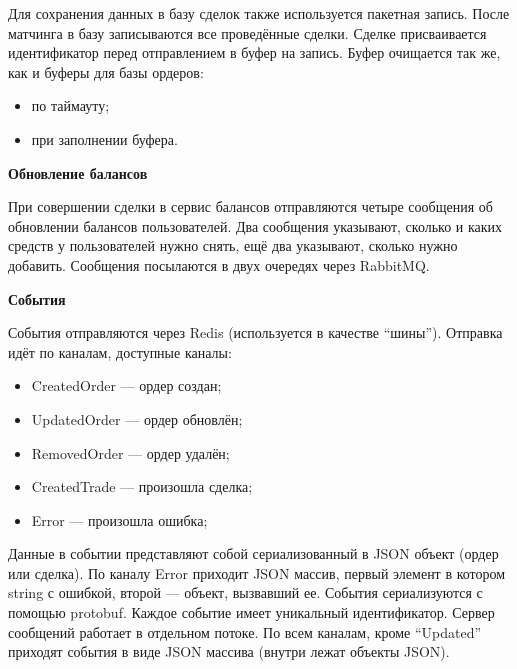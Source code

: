 Для сохранения данных в базу сделок также используется пакетная запись.
После матчинга в базу записываются все проведённые сделки.
Сделке присваивается идентификатор перед отправлением в буфер на запись.
Буфер очищается так же, как и буферы для базы ордеров:

\begin{itemize}
    \item по таймауту;
    \item при заполнении буфера.
\end{itemize}

\textbf{Обновление балансов}

При совершении сделки в сервис балансов отправляются четыре сообщения об обновлении балансов пользователей. Два сообщения указывают, сколько и каких средств у пользователей нужно снять, ещё два указывают, сколько нужно добавить. Сообщения посылаются в двух очередях через RabbitMQ.

\textbf{События}

События отправляются через Redis (используется в качестве ``шины''). Отправка идёт по каналам, доступные каналы:

\begin{itemize}
    \item CreatedOrder — ордер создан;
    \item UpdatedOrder — ордер обновлён;
    \item RemovedOrder — ордер удалён;
    \item CreatedTrade — произошла сделка;
    \item Error — произошла ошибка;
\end{itemize}

Данные в событии представляют собой сериализованный в JSON объект (ордер или сделка).
По каналу Error приходит JSON массив, первый элемент в котором string с ошибкой, второй — объект, вызвавший ее.
События сериализуются с помощью protobuf. Каждое событие имеет уникальный идентификатор.
Сервер сообщений работает в отдельном потоке.
По всем каналам, кроме ``Updated'' приходят события в виде JSON массива (внутри лежат объекты JSON).

